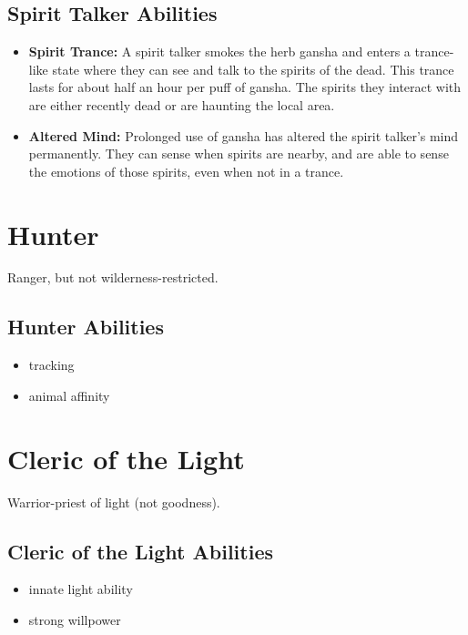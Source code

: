 \begin{multicols}{2}
\subsection{Spirit Talker Abilities}

\begin{itemize}
    \item \textbf{Spirit Trance:} A spirit talker smokes the herb gansha and
    enters a trance-like state where they can see and talk to the spirits of
    the dead. This trance lasts for about half an hour per puff of gansha. The
    spirits they interact with are either recently dead or are haunting the
    local area.
    \item \textbf{Altered Mind:} Prolonged use of gansha has altered the spirit
    talker's mind permanently. They can sense when spirits are nearby, and are
    able to sense the emotions of those spirits, even when not in a trance.
\end{itemize}

\section{Hunter}

Ranger, but not wilderness-restricted.

\subsection{Hunter Abilities}

\begin{itemize}
    \item tracking
    \item animal affinity
\end{itemize}

\section{Cleric of the Light}

Warrior-priest of light (not goodness).

\subsection{Cleric of the Light Abilities}

\begin{itemize}
    \item innate light ability
    \item strong willpower
\end{itemize}


\end{multicols}
